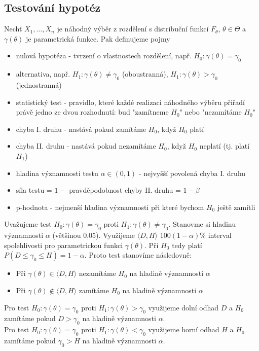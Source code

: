 \subsection{Testování hypotéz}
\begin{definition}
Nechť $X_1,\ldots,X_n$ je náhodný výběr z rozdělení s distribuční funkcí $F_{\theta}$, $\theta \in \Theta$ a $ \gamma \left(\theta \right)$ je parametrická funkce. Pak definujeme pojmy \begin{itemize}
\item nulová hypotéza - tvrzení o vlastnostech rozdělení, např. $H_0 : \gamma \left(\theta \right) = \gamma_0$
\item alternativa, např.  $H_1 : \gamma \left(\theta \right) \neq \gamma_0$ (oboustranná),  $H_1 : \gamma \left(\theta \right) > \gamma_0$ (jednostranná)
\item statistický test - pravidlo, které každé realizaci náhodného výběru přiřadí právě jedno ze dvou rozhodnutí: buď "zamítneme $H_0$" nebo "nezamítáme $H_0$"
\item chyba I. druhu - nastává pokud zamítáme $H_0$, když $H_0$ platí
\item chyba II. druhu - nastává pokud nezamítáme $H_0$, když $H_0$ neplatí (tj. platí $H_1$)
\item hladina významnosti testu $\alpha \in \left( 0,1 \right)$ - nejvyšší povolená chyba I. druhu
\item síla testu = $1 -$ pravděpodobnost chyby II. druhu = $1 - \beta$
\item p-hodnota - nejmenší hladina významnosti při které bychom $H_0$ ještě zamítli 
\end{itemize}
\end{definition}

\begin{notes}
Uvažujeme test $H_0 : \gamma \left(\theta \right) = \gamma_0$ proti $H_1 : \gamma \left(\theta \right) \neq \gamma_0$. Stanovme si hladinu významnosti $\alpha$ (většinou 0,05). Využijeme $\langle D, H \rangle$ $100\left(1-\alpha \right)\%$ interval spolehlivosti pro parametrickou funkci $\gamma \left(\theta \right)$. Při $H_0$ tedy platí $P \left(D \leq \gamma_0 \leq H \right) = 1 - \alpha$. Proto test stanovíme následovně:\begin{itemize}
\item Při $\gamma \left(\theta \right) \in \langle D, H \rangle$ nezamítáme $H_0$ na hladině významnosti $\alpha$
\item Při $\gamma \left(\theta \right) \notin \langle D, H \rangle$ zamítáme $H_0$ na hladině významnosti $\alpha$
\end{itemize}
Pro test $H_0 : \gamma \left(\theta \right) = \gamma_0$ proti $H_1 : \gamma \left(\theta \right) > \gamma_0$ využijeme dolní odhad $D$ a $H_0$ zamítáme pokud $D > \gamma_0$ na hladině významnosti $\alpha$.\\
Pro test $H_0 : \gamma \left(\theta \right) = \gamma_0$ proti $H_1 : \gamma \left(\theta \right) < \gamma_0$ využijeme horní odhad $H$ a $H_0$ zamítáme pokud $\gamma_0 > H$ na hladině významnosti $\alpha$.
\end{notes}

